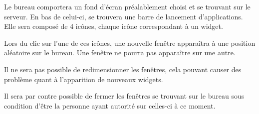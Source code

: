 Le bureau comportera un fond d'écran préalablement choisi et se trouvant sur le serveur. En bas de celui-ci, se trouvera une barre de lancement d'applications. Elle sera composé de 4 icônes, chaque icône correspondant à un widget. 

Lors du clic sur l'une de ces icônes, une nouvelle fenêtre apparaîtra à une position aléatoire sur le bureau. Une fenêtre ne pourra pas apparaître sur une autre. 

Il ne sera pas possible de redimensionner les fenêtres, cela pouvant causer des problème quant à l'apparition de nouveaux widgets. 

Il sera par contre possible de fermer les fenêtres se trouvant sur le bureau sous condition d'être la personne ayant autorité sur celles-ci à ce moment.
